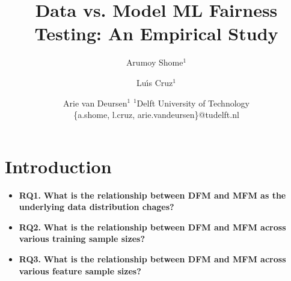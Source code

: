 \documentclass{article}
\title{Data vs. Model ML Fairness Testing: An Empirical Study}
\author{
  Arumoy Shome$^1$
  \and
  Lu{\'\i}s Cruz$^1$\and
  Arie van Deursen$^{1}$
  \affiliations
  $^1$Delft University of Technology\\
  \emails
  \{a.shome, l.cruz, arie.vandeursen\}@tudelft.nl
}
\begin{document}
\maketitle

\begin{abstract}
\end{abstract}

\section{Introduction}\label{sec:intro}







\begin{itemize}
\item{\textbf{RQ1.}} \textbf{What is the relationship between DFM
  and MFM as the underlying data distribution chages?}
\item{\textbf{RQ2.}} \textbf{What is the relationship between DFM and
  MFM across various training sample sizes?}
\item{\textbf{RQ3.}} \textbf{What is the relationship between DFM and
  MFM across various feature sample sizes?}
\end{itemize}
\end{document}
